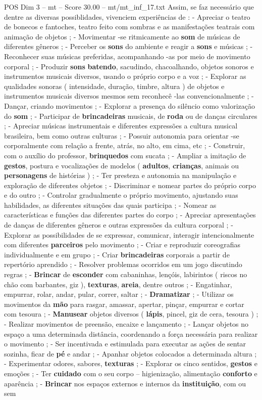\begin{textsample}{POS Dim 3 – mt – Score 30.00 – mt/mt\_inf\_17.txt}
Assim, se faz necessário que dentre as diversas possiblidades, vivenciem experiências de : - Apreciar o teatro de bonecos e fantoches, teatro feito com sombras e as manifestações teatrais com animação de objetos ; - Movimentar -se ritmicamente ao \textbf{som} de músicas de diferentes gêneros ; - Perceber os \textbf{sons} do ambiente e reagir a \textbf{sons} e músicas ; - Reconhecer suas músicas preferidas, acompanhando -as por meio de movimento corporal ; - Produzir \textbf{sons} \textbf{batendo}, sacudindo, chacoalhando, objetos sonoros e instrumentos musicais diversos, usando o próprio corpo e a voz ; - Explorar as qualidades sonoras ( intensidade, duração, timbre, altura ) de objetos e instrumentos musicais diversos mesmos sem reconhecê -las convencionalmente ; - Dançar, criando movimentos ; - Explorar a presença do silêncio como valorização do \textbf{som} ; - Participar de \textbf{brincadeiras} musicais, de \textbf{roda} ou de danças circulares ; - Apreciar músicas instrumentais e diferentes expressões a cultura musical brasileira, bem como outras culturas ; - Possuir autonomia para orientar -se corporalmente com relação a frente, atrás, no alto, em cima, etc ; - Construir, com o auxílio do professor, \textbf{brinquedos} com sucata ; - Ampliar a imitação de \textbf{gestos}, postura e vocalizações de modelos ( \textbf{adultos}, \textbf{crianças}, animais ou \textbf{personagens} de histórias ) ; - Ter presteza e autonomia na manipulação e exploração de diferentes objetos ; - Discriminar e nomear partes do próprio corpo e do outro ; - Controlar gradualmente o próprio movimento, ajustando suas habilidades, as diferentes situações das quais participa ; - Nomear as características e funções das diferentes partes do corpo ; - Apreciar apresentações de danças de diferentes gêneros e outras expressões da cultura corporal ; - Explorar as possibilidades de se expressar, comunicar, interagir intencionalmente com diferentes \textbf{parceiros} pelo movimento ; - Criar e reproduzir coreografias individualmente e em grupo ; - Criar \textbf{brincadeiras} corporais a partir de repertório aprendido ; - Resolver problemas ocorridos em um jogo discutindo regras ; - \textbf{Brincar} de \textbf{esconder} com cabaninhas, lençóis, labirintos ( riscos no chão com barbantes, giz ), \textbf{texturas}, \textbf{areia}, dentre outros ; - Engatinhar, empurrar, rolar, andar, pular, correr, saltar ; - \textbf{Dramatizar} ; - Utilizar os movimentos da \textbf{mão} para rasgar, amassar, apertar, pinçar, empurrar e cortar com tesoura ; - \textbf{Manusear} objetos diversos ( \textbf{lápis}, pincel, giz de cera, tesoura ) ; - Realizar movimentos de preensão, encaixe e lançamento ; - Lançar objetos no espaço a uma determinada distância, coordenando a força necessária para realizar o movimento ; - Ser incentivada e estimulada para executar as ações de sentar sozinha, ficar de \textbf{pé} e andar ; - Apanhar objetos colocados a determinada altura ; - Experimentar odores, sabores, \textbf{texturas} ; - Explorar os cinco sentidos, \textbf{gestos} e emoções ; - Ter \textbf{cuidado} com o seu corpo – higienização, alimentação \textbf{conforto} e aparência ; - \textbf{Brincar} nos espaços externos e internos da \textbf{instituição}, com ou sem 
\end{textsample}
